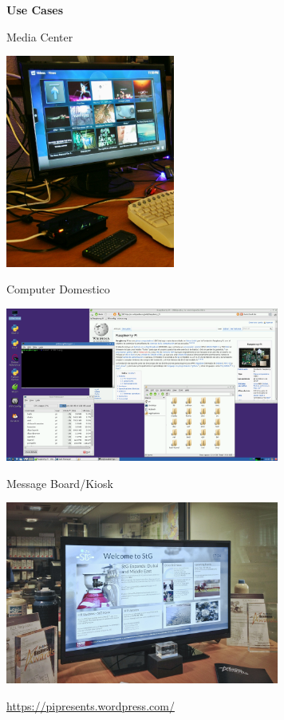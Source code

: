 \documentclass[xcolor=svgnames,11pt]{beamer}
\begin{document}
\begin{frame}{}
\begin{center}
\begin{Huge}
{\color{green_raspi} \textbf{Use Cases}}
\end{Huge}
\end{center}

\end{frame}

\begin{frame}{Media Center}
\begin{center}
\includegraphics[height=7cm]{uc/media.jpg}
\end{center}
\end{frame}

\begin{frame}{Computer Domestico}
\begin{center}
\includegraphics[width=9cm]{uc/pc.png}
\end{center}
\end{frame}

\begin{frame}{Message Board/Kiosk}
\begin{center}
\includegraphics[width=9cm]{uc/board.jpg}

\medskip
\url{https://pipresents.wordpress.com/}
\end{center}
\end{frame}
\end{document}
